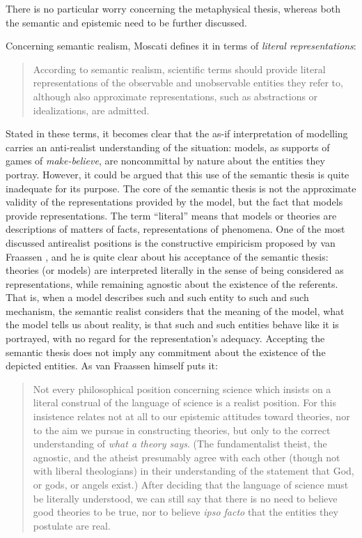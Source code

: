 \documentclass[a4paper,11pt]{article}
\theoremstyle{definition}
\begin{document}
There is no particular worry concerning the metaphysical thesis, whereas both the semantic and epistemic need to be further discussed.

Concerning semantic realism, Moscati defines it in terms of \textit{literal representations}:

\begin{quote}
    According to semantic realism, scientific terms should provide literal representations of the observable and unobservable entities they refer to, although also approximate representations, such as abstractions or idealizations, are admitted. \citep[p.~18]{Moscati2023}
\end{quote}

Stated in these terms, it becomes clear that the as-if interpretation of modelling carries an anti-realist understanding of the situation: models, as supports of games of \textit{make-believe}, are noncommittal by nature about the entities they portray. However, it could be argued that this use of the semantic thesis is quite inadequate for its purpose. The core of the semantic thesis is not the approximate validity of the representations provided by the model, but the fact that models provide representations. The term ``literal'' means that models or theories are descriptions of matters of facts, representations of phenomena. One of the most discussed antirealist positions is the constructive empiricism proposed by van Fraassen \citep{vanFraassen1980}, and he is quite clear about his acceptance of the semantic thesis: theories (or models) are interpreted literally in the sense of being considered as representations, while remaining agnostic about the existence of the referents. That is, when a model describes such and such entity to such and such mechanism, the semantic realist considers that the meaning of the model, what the model tells us about reality, is that such and such entities behave like it is portrayed, with no regard for the representation's adequacy. Accepting the semantic thesis does not imply any commitment about the existence of the depicted entities. As van Fraassen himself puts it:

\begin{quote}
    Not every philosophical position concerning science which insists on a literal construal of the language of science is a realist position. For this insistence relates not at all to our epistemic attitudes toward theories, nor to the aim we pursue in constructing theories, but only to the correct understanding of \textit{what a theory says}. (The fundamentalist theist, the agnostic, and the atheist presumably agree with each other (though not with liberal theologians) in their understanding of the statement that God, or gods, or angels exist.) After deciding that the language of science must be literally understood, we can still say that there is no need to believe good theories to be true, nor to believe \textit{ipso facto} that the entities they postulate are real. \citep[pp.~11-12]{vanFraassen1980}
\end{quote}
\end{document}
